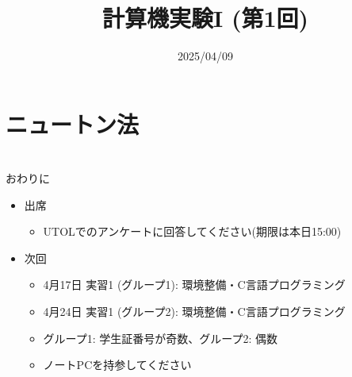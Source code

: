 \documentclass[10pt,dvipdfmx]{beamer}
\title{計算機実験I (第1回)}
\date{2025/04/09}
\begin{document}
\begin{frame}
  \titlepage
  \tableofcontents
\end{frame}







\section{ニュートン法}














\section{}
\begin{frame}[t]{おわりに}
  \begin{itemize}
  \item 出席
  \begin{itemize}
    \item UTOLでのアンケートに回答してください(期限は本日15:00)
  \end{itemize}
  \item 次回
    \begin{itemize}
    \item 4月17日 実習1 (グループ1): 環境整備・C言語プログラミング
    \item 4月24日 実習1 (グループ2): 環境整備・C言語プログラミング
    \item グループ1: 学生証番号が奇数、グループ2: 偶数
    \item ノートPCを持参してください
    \end{itemize}
  \end{itemize}
\end{frame}
\end{document}
